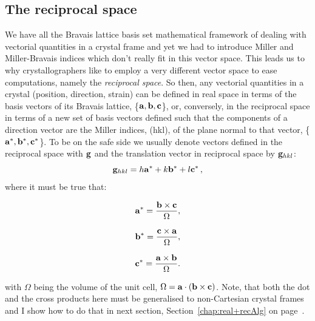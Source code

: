 \subsection{The reciprocal space}
\label{sec:recMB}
We have all the Bravais lattice basis set mathematical framework of dealing with vectorial quantities in a crystal frame and yet we had to introduce Miller and Miller-Bravais indices which don't really fit in this vector space. This leads us to why crystallographers like to employ a very different vector space to ease computations, namely the \textit{reciprocal space}. So then, any vectorial quantities in a crystal (\ie position, direction, strain) can be defined in real space in terms of the basis vectors of its Bravais lattice, \{$\vb{a},\vb{b}, \vb{c}$\}, or, conversely, in the reciprocal space in terms of a new set of basis vectors defined such that the components of a direction vector are the Miller indices, \hkl(hkl), of the plane normal to that vector, \{$\vb{a^*},\vb{b^*}, \vb{c^*}$\}. To be on the safe side we usually denote vectors defined in the reciprocal space with $\vb{g}$ and the translation vector in reciprocal space by $\vb{g}_{hkl}$:
\begin{equation}
\label{eq:ghkl}
\vb{g}_{hkl} = h\vb{a^*}+k\vb{b^*}+l\vb{c^*}\,,
\end{equation}
where it must be true that:
\noindent\begin{minipage}{.2\linewidth}
\begin{equation*}
  \vb{a^*} = \frac{\vb{b} \times \vb{c}}{\Omega},
\end{equation*}
\end{minipage}%
\begin{minipage}{.2\linewidth}
\begin{equation*}
   \vb{b^*} = \frac{\vb{c} \times \vb{a}}{\Omega},
\end{equation*}
\end{minipage}%
\begin{minipage}{.285\linewidth}
\begin{equation}
\label{eq:recVectors}
  \vb{c^*} = \frac{\vb{a} \times \vb{b}}{\Omega}.
\end{equation}
\end{minipage}

\noindent with $\Omega$ being the volume of the unit cell, $\Omega=\vb{a}\cdot (\vb{b}\times \vb{c})$. Note, that both the dot and the cross products here must be generalised to non-Cartesian crystal frames and I show how to do that in next section, Section~\ref{chap:real+recAlg} on page~\pageref{chap:real+recAlg}. 


